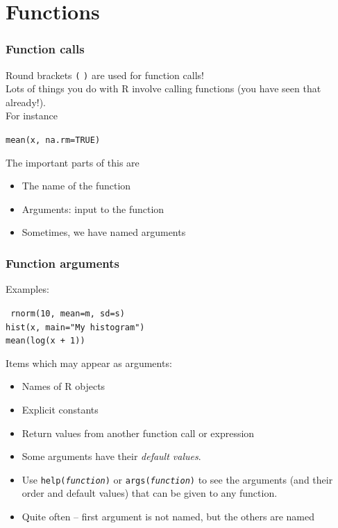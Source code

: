 \documentclass[xcolor=svgnames,handout]{beamer}
\newcommand{\code}[1]{\texttt{#1}}
\begin{document}
\section{Functions}
\begin{frame} 
  \frametitle{Function calls}
 \alert{{\large Round brackets \code{(} \code{)} are used for function calls!}}\\[0.2cm]
  Lots of things you do with R involve calling functions (you have seen that already!).\\
  For instance
  \begin{center}
    \large
    \texttt{\alert<2>{mean}(\alert<3>{x}, \alert<4>{na.rm=\alert<3>{TRUE}})}
  \end{center}
  The important parts of this are
  \pause
\begin{itemize}
\item The \alert<2>{name} of the function
\item \alert<3>{Arguments}: input to the function
 \item Sometimes, we have \alert<4>{named arguments}
\end{itemize}
\end{frame}

\begin{frame}
  \frametitle{Function arguments}
Examples:
  \begin{center}
    \large
\texttt{
rnorm(\alert<3>{10}, \alert<6>{mean=}\alert<2>{m}, 
    \alert<6>{sd=}\alert<2>{s})\\
hist(\alert<2>{x}, \alert<6>{main=}\alert<3>{"My histogram"})\\
mean(\alert<4>{log(x + 1)})}
  \end{center}
Items which may appear as arguments:
  \begin{itemize}
  \item \alert<2>{Names} of R objects
  \item Explicit \alert<3>{constants}
  \item \alert<4>{Return values} from another function call or expression
  \item Some arguments have their \emph{default values}. 
\item 
Use \code{help(\textit{function})} or  \code{args(\textit{function})} to see the arguments (and their order and default values) that can be given to any function. 
\item Quite often -- first argument is not named, but the others are named
  \end{itemize}
\end{frame}
\end{document}
